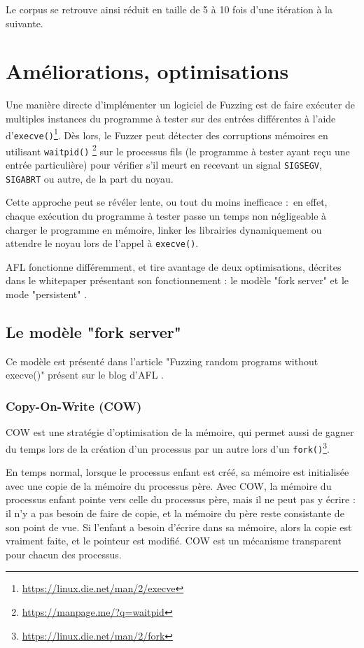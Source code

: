 Le corpus se retrouve ainsi réduit en taille de 5 à 10 fois d'une itération
à la suivante.

\section{Améliorations, optimisations}

Une manière directe d'implémenter un logiciel de Fuzzing est de faire exécuter de multiples instances du programme à tester sur des entrées différentes à l'aide d'\lstinline{execve()}\footnote{\url{https://linux.die.net/man/2/execve}}.
Dès lors, le Fuzzer peut détecter des corruptions mémoires en utilisant \lstinline{waitpid()} \footnote{\url{https://manpage.me/?q=waitpid}} sur le processus fils (le programme à tester ayant reçu une entrée particulière) pour vérifier s'il meurt en recevant un signal \lstinline{SIGSEGV}, \lstinline{SIGABRT} ou autre, de la part du noyau.

Cette approche peut se révéler lente, ou tout du moins inefficace : en effet, chaque exécution du programme à tester passe un temps non négligeable à charger le programme en mémoire, linker les librairies dynamiquement ou attendre le noyau lors de l'appel à \lstinline{execve()}.

AFL fonctionne différemment, et tire avantage de deux optimisations, décrites dans le whitepaper présentant son fonctionnement : le modèle "fork server" et le mode "persistent" \cite{technical-details}.


\subsection{Le modèle "fork server"}\label{fork-server}

Ce modèle est présenté dans l'article "Fuzzing random programs without execve()" présent sur le blog d'AFL \cite{fuzzing-binaries-without-execve}.

\subsubsection{Copy-On-Write (COW)}

COW est une stratégie d'optimisation de la mémoire, qui permet aussi de gagner du temps lors de la création d'un processus par un autre lors d'un \lstinline{fork()}\footnote{\url{https://linux.die.net/man/2/fork}}.

En temps normal, lorsque le processus enfant est créé, sa mémoire est initialisée avec une copie de la mémoire du processus père.
Avec COW, la mémoire du processus enfant pointe vers celle du processus père, mais il ne peut pas y écrire : il n'y a pas besoin de faire de copie, et la mémoire du père reste consistante de son point de vue.
Si l'enfant a besoin d'écrire dans sa mémoire, alors la copie est vraiment faite, et le pointeur est modifié.
COW est un mécanisme transparent pour chacun des processus.

